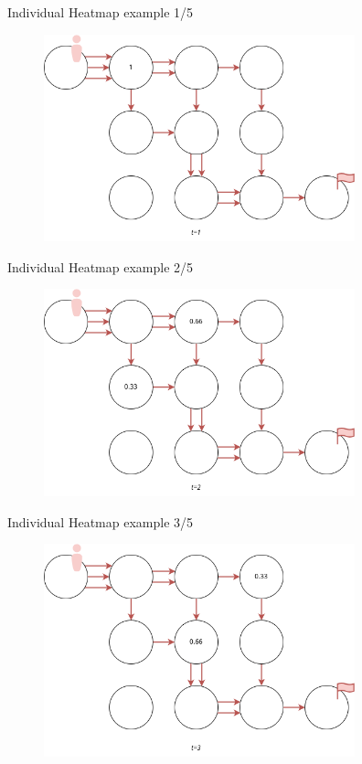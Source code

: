 \begin{frame}{Individual Heatmap example 1/5}

    \begin{figure}[H]
        \centering
        \includegraphics[width=9cm]{img/individual_heatmap_p1.drawio.png}
    \end{figure}
\end{frame}

\begin{frame}{Individual Heatmap example 2/5}
    \begin{figure}[H]
        \centering
        \includegraphics[width=9cm]{img/individual_heatmap_p2.drawio.png}
    \end{figure}
\end{frame}


\begin{frame}{Individual Heatmap example 3/5}
    \begin{figure}[H]
        \centering
        \includegraphics[width=9cm]{img/individual_heatmap_p3.drawio.png}
    \end{figure}
\end{frame}

